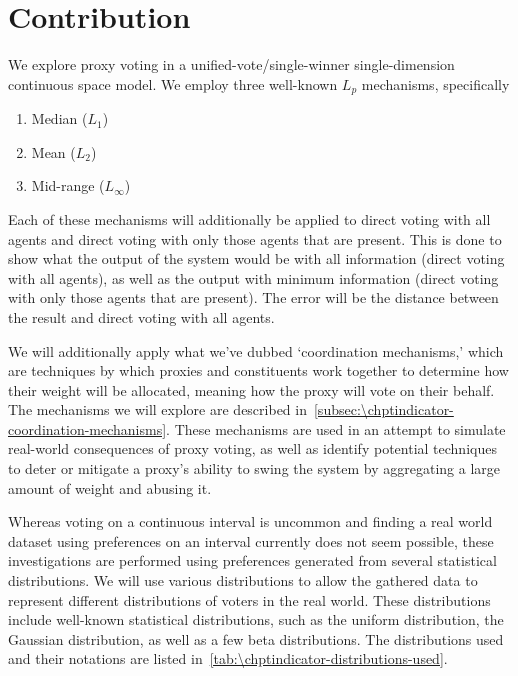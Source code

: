 \section{Contribution}\label{sec:\chptindicator-contribution}
We explore proxy voting in a unified-vote/single-winner single-dimension
continuous space model.
We employ three well-known $L_p$ mechanisms, specifically
\begin{enumerate}
    \item {
        Median ($L_1$)
    }
    \item {
        Mean ($L_2$)
    }
    \item {
        Mid-range ($L_\infty$)
    }
\end{enumerate}
Each of these mechanisms will additionally be applied to direct voting with all
agents and direct voting with only those agents that are present.
This is done to show what the output of the system would be with all information
(direct voting with all agents), as well as the output with minimum information
(direct voting with only those agents that are present).
The error will be the distance between the result and direct voting with all agents.

We will additionally apply what we've dubbed `coordination mechanisms,' which are
techniques by which proxies and constituents work together to determine how their
weight will be allocated, meaning how the proxy will vote on their behalf.
The mechanisms we will explore are described
in~\autoref{subsec:\chptindicator-coordination-mechanisms}.
These mechanisms are used in an attempt to simulate real-world consequences of proxy
voting, as well as identify potential techniques to deter or mitigate a proxy's
ability to swing the system by aggregating a large amount of weight and abusing it.

Whereas voting on a continuous interval is uncommon and finding a real world dataset
using preferences on an interval currently does not seem possible, these investigations
are performed using preferences generated from several statistical distributions.
We will use various distributions to allow the gathered data to represent
different distributions of voters in the real world.
These distributions include well-known statistical distributions, such as the uniform
distribution, the Gaussian distribution, as well as a few beta distributions.
The distributions used and their notations are listed
in~\autoref{tab:\chptindicator-distributions-used}.


